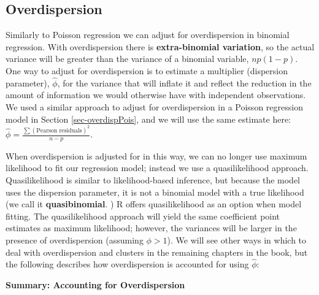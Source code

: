 \documentclass[
]{krantz}
\begin{document}
\hypertarget{sec-logOverdispersion}{%
\subsection{Overdispersion}\label{sec-logOverdispersion}}

Similarly to Poisson regression we can adjust for overdispersion  in binomial regression. With overdispersion there is \textbf{extra-binomial variation},  so the actual variance will be greater than the variance of a binomial variable, \(np(1-p)\). One way to adjust for overdispersion is to estimate a multiplier (dispersion parameter), \(\hat{\phi}\), for the variance that will inflate it and reflect the reduction in the amount of information we would otherwise have with independent observations. We used a similar approach to adjust for overdispersion in a Poisson regression model in Section \ref{sec-overdispPois}, and we will use the same estimate here: \(\hat\phi=\frac{\sum(\textrm{Pearson residuals})^2}{n-p}\).

When overdispersion is adjusted for in this way, we can no longer use maximum likelihood to fit our regression model; instead we use a quasilikelihood approach.  Quasilikelihood is similar to likelihood-based inference, but because the model uses the dispersion parameter, it is not a binomial model with a true likelihood (we call it \textbf{quasibinomial}. ) R offers quasilikelihood as an option when model fitting. The quasilikelihood approach will yield the same coefficient point estimates as maximum likelihood; however, the variances will be larger in the presence of overdispersion (assuming \(\phi>1\)). We will see other ways in which to deal with overdispersion and clusters in the remaining chapters in the book, but the following describes how overdispersion is accounted for using \(\hat{\phi}\):
\vspace{5mm}

\textbf{Summary: Accounting for Overdispersion}
\end{document}
